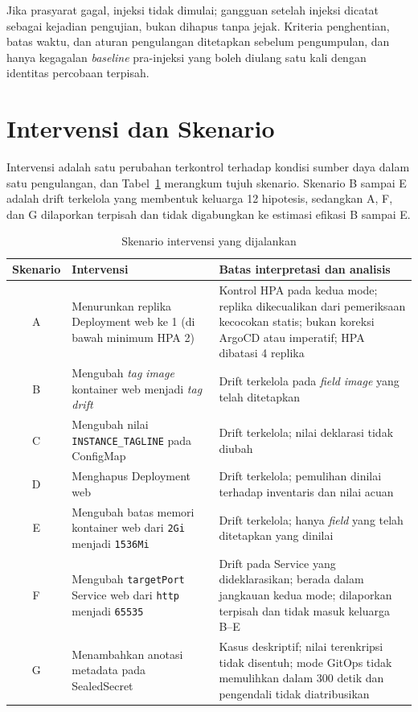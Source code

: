 Jika prasyarat gagal, injeksi tidak dimulai; gangguan setelah injeksi dicatat sebagai kejadian pengujian, bukan dihapus tanpa jejak. Kriteria penghentian, batas waktu, dan aturan pengulangan ditetapkan sebelum pengumpulan, dan hanya kegagalan \textit{baseline} pra-injeksi yang boleh diulang satu kali dengan identitas percobaan terpisah.

\section{Intervensi dan Skenario}
\label{sec:intervensi-skenario}

Intervensi adalah satu perubahan terkontrol terhadap kondisi sumber daya dalam satu pengulangan, dan Tabel~\ref{tab:skenario-intervensi} merangkum tujuh skenario. Skenario B sampai E adalah drift terkelola yang membentuk keluarga 12 hipotesis, sedangkan A, F, dan G dilaporkan terpisah dan tidak digabungkan ke estimasi efikasi B sampai E.

\begin{table}[H]
  \centering
  \small
  \caption{Skenario intervensi yang dijalankan}
  \label{tab:skenario-intervensi}
  \begin{tabularx}{\textwidth}{|c|>{\raggedright\arraybackslash}p{3.3cm}|>{\raggedright\arraybackslash}X|}
    \hline
    Skenario & Intervensi & Batas interpretasi dan analisis \\
    \hline
    A & Menurunkan replika Deployment web ke 1 (di bawah minimum HPA 2) & Kontrol HPA pada kedua mode; replika dikecualikan dari pemeriksaan kecocokan statis; bukan koreksi ArgoCD atau imperatif; HPA dibatasi 4 replika \\
    \hline
    B & Mengubah \textit{tag} \textit{image} kontainer web menjadi \textit{tag} \textit{drift} & Drift terkelola pada \textit{field} \textit{image} yang telah ditetapkan \\
    \hline
    C & Mengubah nilai \texttt{INSTANCE\_}\allowbreak\texttt{TAGLINE} pada ConfigMap & Drift terkelola; nilai deklarasi tidak diubah \\
    \hline
    D & Menghapus Deployment web & Drift terkelola; pemulihan dinilai terhadap inventaris dan nilai acuan \\
    \hline
    E & Mengubah batas memori kontainer web dari \texttt{2Gi} menjadi \texttt{1536Mi} & Drift terkelola; hanya \textit{field} yang telah ditetapkan yang dinilai \\
    \hline
    F & Mengubah \texttt{targetPort} Service web dari \texttt{http} menjadi \texttt{65535} & Drift pada Service yang dideklarasikan; berada dalam jangkauan kedua mode; dilaporkan terpisah dan tidak masuk keluarga B--E \\
    \hline
    G & Menambahkan anotasi metadata pada SealedSecret & Kasus deskriptif; nilai terenkripsi tidak disentuh; mode GitOps tidak memulihkan dalam 300 detik dan pengendali tidak diatribusikan \\
    \hline
  \end{tabularx}
\end{table}

